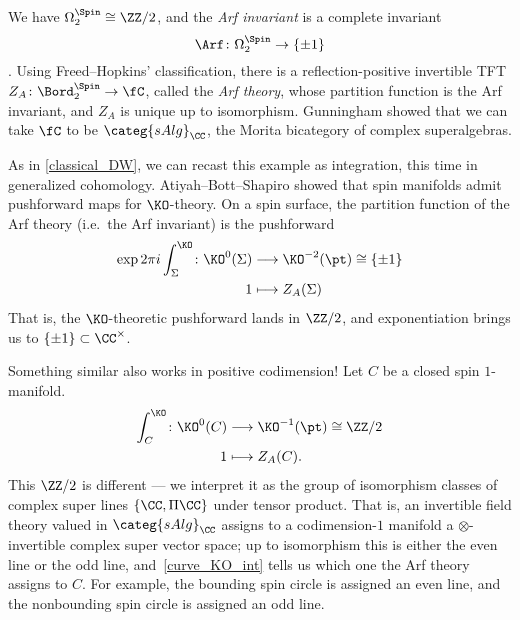 \begin{example}
	\label{arf_TFT}
	We have $\Omega_2^{\Spin}\cong\ZZ/2$, and the \textit{Arf invariant} is a complete invariant
	\begin{equation*}
		\Arf\colon \Omega_2^{\Spin}\to\{\pm 1\}
	\end{equation*}
	\cite[Proposition (4.1)]{Ati71}. 
	Using Freed--Hopkins' classification, there is a
	reflection-positive invertible TFT $Z_A\colon\Bord_2^{\Spin}\to\fC$, called the \textit{Arf theory}, whose
	partition function is the Arf invariant, and $Z_A$ is unique up to isomorphism. Gunningham \cite[Example
	2.19]{Gun16} showed that we can take $\fC$ to be $\categ{sAlg}_\CC$, the Morita bicategory of complex
	superalgebras.

	As in \cref{classical_DW}, we can recast this example as integration, this time in generalized cohomology.
	Atiyah--Bott--Shapiro \cite{ABS64} showed that spin manifolds admit pushforward maps for $\KO$-theory. On a
	spin surface, the partition function of the Arf theory (i.e.\ the Arf invariant) is the pushforward
	\begin{equation}
	\begin{aligned}
			\exp2 \pi i\int_\Sigma^{\KO}\colon \KO^0(\Sigma) &\longrightarrow \KO^{-2}(\pt)\cong\{\pm 1\}\\
		1 &\longmapsto Z_A(\Sigma)
	\end{aligned}
	\end{equation}
	That is, the $\KO$-theoretic pushforward lands in $\ZZ/2$, and exponentiation brings us to $\{\pm
	1\}\subset\CC^\times$.

	Something similar also works in positive codimension! Let $C$ be a closed spin $1$-manifold.
	\begin{equation}
	\label{curve_KO_int}
	\begin{aligned}
		\int_C^{\KO}\colon \KO^0(C) &\longrightarrow \KO^{-1}(\pt)\cong\ZZ/2\\
		1 &\longmapsto Z_A(C).
	\end{aligned}
	\end{equation}
	This $\ZZ/2$ is different --- we interpret it as the group of isomorphism classes of complex super lines
	$\{\CC, \Pi\CC\}$ under tensor product. That is, an invertible field theory valued in $\categ{sAlg}_\CC$
	assigns to a codimension-$1$ manifold a $\otimes$-invertible complex super vector space; up to isomorphism this
	is either the even line or the odd line, and~\eqref{curve_KO_int} tells us which one the Arf theory assigns to
	$C$. For example, the bounding spin circle is assigned an even line, and the nonbounding spin circle is
	assigned an odd line.
\end{example}

